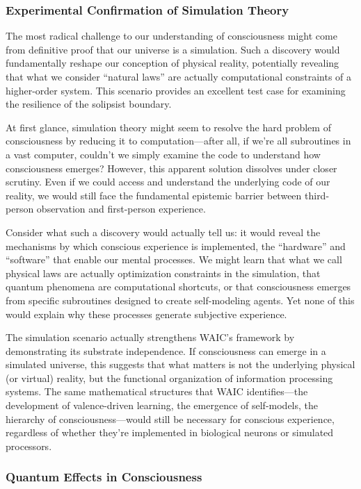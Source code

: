 \documentclass[12pt]{article}
\begin{document}
\subsubsection{Experimental Confirmation of Simulation Theory}

The most radical challenge to our understanding of consciousness might come from definitive proof that our universe is a simulation. Such a discovery would fundamentally reshape our conception of physical reality, potentially revealing that what we consider ``natural laws'' are actually computational constraints of a higher-order system. This scenario provides an excellent test case for examining the resilience of the solipsist boundary.

At first glance, simulation theory might seem to resolve the hard problem of consciousness by reducing it to computation---after all, if we're all subroutines in a vast computer, couldn't we simply examine the code to understand how consciousness emerges? However, this apparent solution dissolves under closer scrutiny. Even if we could access and understand the underlying code of our reality, we would still face the fundamental epistemic barrier between third-person observation and first-person experience.

Consider what such a discovery would actually tell us: it would reveal the mechanisms by which conscious experience is implemented, the ``hardware'' and ``software'' that enable our mental processes. We might learn that what we call physical laws are actually optimization constraints in the simulation, that quantum phenomena are computational shortcuts, or that consciousness emerges from specific subroutines designed to create self-modeling agents. Yet none of this would explain why these processes generate subjective experience.

The simulation scenario actually strengthens WAIC's framework by demonstrating its substrate independence. If consciousness can emerge in a simulated universe, this suggests that what matters is not the underlying physical (or virtual) reality, but the functional organization of information processing systems. The same mathematical structures that WAIC identifies---the development of valence-driven learning, the emergence of self-models, the hierarchy of consciousness---would still be necessary for conscious experience, regardless of whether they're implemented in biological neurons or simulated processors.

\subsubsection{Quantum Effects in Consciousness}
\end{document}
